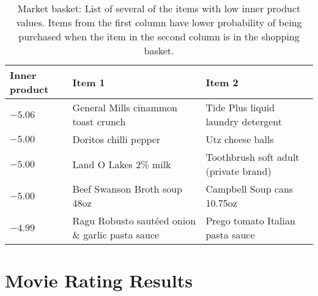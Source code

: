 \documentclass[12pt]{article}
\begin{document}
\begin{table}[h]
	\centering
  \scriptsize
	\begin{tabular}{lll}\toprule
		Inner product & Item 1 & Item 2 \\ \hline
    $-5.06$ & General Mills cinammon toast crunch & Tide Plus liquid laundry detergent \\
    $-5.00$ & Doritos chilli pepper & Utz cheese balls \\
    $-5.00$ & Land O Lakes 2\% milk & Toothbrush soft adult (private brand) \\
    $-5.00$ & Beef Swanson Broth soup 48oz & Campbell Soup cans 10.75oz \\
    $-4.99$ & Ragu Robusto saut\'{e}ed onion \& garlic pasta sauce & Prego tomato Italian pasta sauce \\
    \bottomrule
	\end{tabular}
	\caption{Market basket: List of several of the items with low inner product values. Items from the first column have lower probability of being purchased when the item in the second column is in the shopping basket.\label{tab:iri_low_inner_prod}}
\end{table}

\newpage
\section{Movie Rating Results}
\label{sec:movie}
\end{document}
